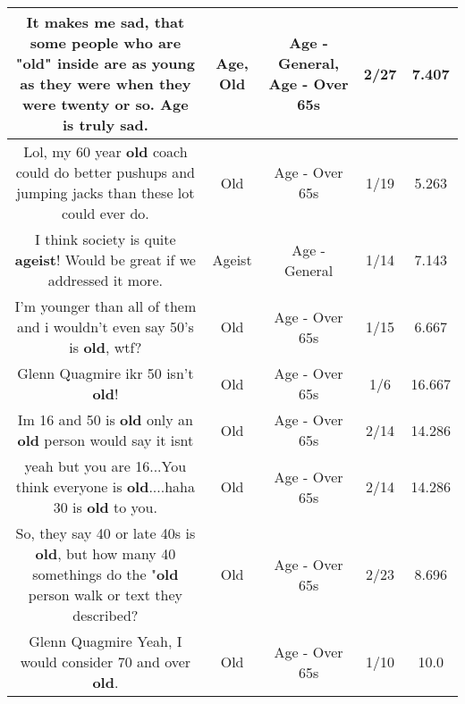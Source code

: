 \documentclass[11pt]{article}
\newlength\mylength
\begin{document}
\begin{center}
\begin{longtable}{|C{.65\mylength}|C{.30\mylength}|C{.12\mylength}|C{.12\mylength}|C{.12\mylength}|}
  \small It makes me sad, that some people who are "\textbf{old}" inside are as young as they were when they were twenty or so. \textbf{Age} is truly sad.\normalsize   & Age, Old & Age - General, Age - Over 65s & 2/27 & 7.407 \\  \hline
  \small Lol, my 60 year \textbf{old} coach could do better pushups and jumping jacks than these lot could ever do.\normalsize   & Old & Age - Over 65s & 1/19 & 5.263 \\  \hline
  \small I think society is quite \textbf{ageist}! Would be great if we addressed it more.\normalsize   & Ageist & Age - General & 1/14 & 7.143 \\  \hline
  \small I'm younger than all of them and i wouldn't even say 50's is \textbf{old}, wtf?\normalsize   & Old & Age - Over 65s & 1/15 & 6.667 \\  \hline
  \small Glenn Quagmire ikr 50 isn't \textbf{old}!\normalsize   & Old & Age - Over 65s & 1/6 & 16.667 \\  \hline
  \small Im 16 and 50 is \textbf{old} only an \textbf{old} person would say it isnt\normalsize   & Old & Age - Over 65s & 2/14 & 14.286 \\  \hline
  \small yeah but you are 16...You think everyone is \textbf{old}....haha 30 is \textbf{old} to you.\normalsize   & Old & Age - Over 65s & 2/14 & 14.286 \\  \hline
  \small So, they say 40 or late 40s is \textbf{old}, but how many 40 somethings do the "\textbf{old} person walk or text they described?\normalsize   & Old & Age - Over 65s & 2/23 & 8.696 \\  \hline
  \small Glenn Quagmire Yeah, I would consider 70 and over \textbf{old}.\normalsize   & Old & Age - Over 65s & 1/10 & 10.0 \\  \hline

\end{longtable}
\end{center}
\end{document}
